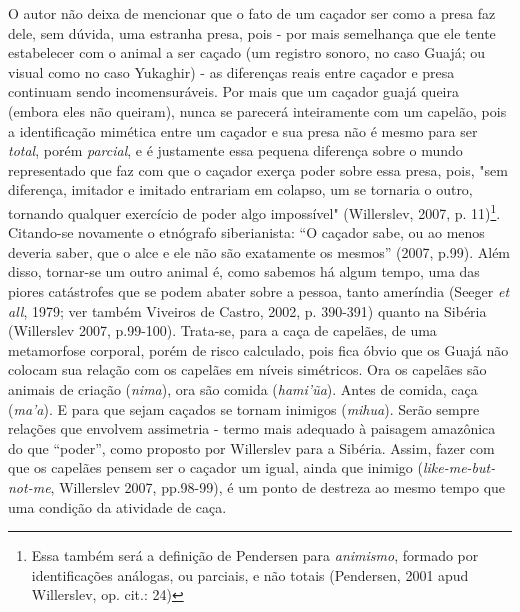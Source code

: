 O autor não deixa de mencionar que o fato de um caçador ser como a presa
faz dele, sem dúvida, uma estranha presa, pois - por mais semelhança que
ele tente estabelecer com o animal a ser caçado (um registro sonoro, no
caso Guajá; ou visual como no caso Yukaghir) - as diferenças reais entre
caçador e presa continuam sendo incomensuráveis. Por mais que um caçador
guajá queira (embora eles não queiram), nunca se parecerá inteiramente
com um capelão, pois a identificação mimética entre um caçador e sua
presa não é mesmo para ser \emph{total}, porém \emph{parcial}, e é
justamente essa pequena diferença sobre o mundo representado que faz com
que o caçador exerça poder sobre essa presa, pois, "sem diferença,
imitador e imitado entrariam em colapso, um se tornaria o outro,
tornando qualquer exercício de poder algo impossível" (Willerslev, 2007,
p. 11)\footnote{Essa também será a definição de Pendersen para
  \emph{animismo}, formado por identificações análogas, ou parciais, e
  não totais (Pendersen, 2001 apud Willerslev, op. cit.: 24)}.
Citando-se novamente o etnógrafo siberianista: ``O caçador sabe, ou ao
menos deveria saber, que o alce e ele não são exatamente os mesmos''
(2007, p.99). Além disso, tornar-se um outro animal é, como sabemos há
algum tempo, uma das piores catástrofes que se podem abater sobre a
pessoa, tanto ameríndia (Seeger \emph{et all}, 1979; ver também Viveiros
de Castro, 2002, p. 390-391) quanto na Sibéria (Willerslev 2007,
p.99-100). Trata-se, para a caça de capelães, de uma metamorfose
corporal, porém de risco calculado, pois fica óbvio que os Guajá não
colocam sua relação com os capelães em níveis simétricos. Ora os
capelães são animais de criação (\emph{nima}), ora são comida
(\emph{hami'ũa}). Antes de comida, caça (\emph{ma'a}). E para que sejam
caçados se tornam inimigos (\emph{mihua}). Serão sempre relações que
envolvem assimetria - termo mais adequado à paisagem amazônica do que
``poder'', como proposto por Willerslev para a Sibéria. Assim, fazer com
que os capelães pensem ser o caçador um igual, ainda que inimigo
(\emph{like-me-but-not-me}, Willerslev 2007, pp.98-99), é um ponto de
destreza ao mesmo tempo que uma condição da atividade de caça.

